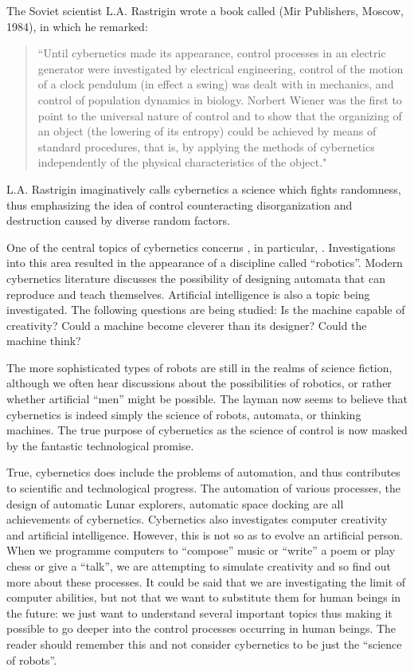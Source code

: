 The Soviet scientist L.A. Rastrigin wrote a book called  (Mir Publishers, Moscow, 1984), in which he
remarked:
\begin{quote}
``Until cybernetics made its appearance, control processes in an
electric generator were investigated by electrical engineering, control of
the motion of a clock pendulum (in effect a swing) was dealt with in
mechanics, and control of population dynamics in biology. Norbert
Wiener was the first to point to the universal nature of control and to
show that the organizing of an object (the lowering of its entropy) could
be achieved by means of standard procedures, that is, by applying the
methods of cybernetics independently of the physical characteristics of
the object."
\end{quote}
L.A. Rastrigin imaginatively calls cybernetics a science which fights
randomness, thus emphasizing the idea of control counteracting
disorganization and destruction caused by diverse random factors.

 One of the central topics of cybernetics
concerns , in particular, . Investigations into this area resulted in the appearance of a discipline called ``robotics''. Modern cybernetics literature discusses the possibility of designing automata that can reproduce and teach themselves.
Artificial intelligence is also a topic being investigated. The following
questions are being studied: Is the machine capable of creativity? Could
a machine become cleverer than its designer? Could the machine think?

The more sophisticated types of robots are still in the realms of
science fiction, although we often hear discussions about the possibilities
of robotics, or rather whether artificial ``men'' might be possible. The
layman now seems to believe that cybernetics is indeed simply the
science of robots, automata, or thinking machines. The true purpose of
cybernetics as the science of control is now masked by the fantastic
technological promise.

True, cybernetics does include the problems of automation, and thus
contributes to scientific and technological progress. The automation of
various processes, the design of automatic Lunar explorers, automatic
space docking are all achievements of cybernetics. Cybernetics also
investigates computer creativity and artificial intelligence. However, this
is not so as to evolve an artificial person. When we programme
computers to ``compose'' music or ``write'' a poem or play chess or give
a ``talk'', we are attempting to simulate creativity and so find out more
about these processes. It could be said that we are investigating the limit
of computer abilities, but not that we want to substitute them for
human beings in the future: we just want to understand several
important topics thus making it possible to go deeper into the control
processes occurring in human beings. The reader should remember this
and not consider cybernetics to be just the ``science of robots''.

